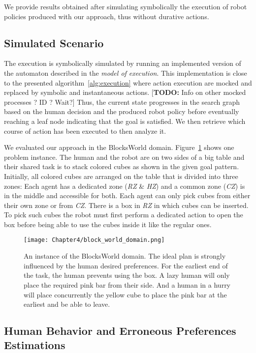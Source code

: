 We provide results obtained after simulating symbolically the execution of robot policies produced with our approach, thus without durative actions. 

    \subsection{Simulated Scenario}

The execution is symbolically simulated by running an implemented version of the automaton described in the \textit{model of execution}. This implementation is close to the presented algorithm~\ref{alg:execution} where action execution are mocked and replaced by symbolic and instantaneous actions. [\textbf{TODO: }Info on other mocked processes ? ID ? Wait?]
Thus, the current state progresses in the search graph based on the human decision and the produced robot policy before eventually reaching a leaf node indicating that the goal is satisfied. 
We then retrieve which course of action has been executed to then analyze it.

We evaluated our approach in the BlocksWorld domain. Figure~\ref{fig:block_world_domain} shows one problem instance. 
The human and the robot are on two sides of a big table and their shared task is to stack colored cubes as shown in the given goal pattern. 
Initially, all colored cubes are arranged on the table that is divided into three zones: Each agent has a dedicated zone (\textit{RZ} \& \textit{HZ}) and a common zone (\textit{CZ}) is in the middle and accessible for both. 
Each agent can only pick cubes from either their own zone or from \textit{CZ}. 
There is a box in \textit{RZ} in which cubes can be inserted. To pick such cubes the robot must first perform a dedicated action to open the box before being able to use the cubes inside it like the regular ones.


\begin{figure}
    \centering
    \texttt{[image: Chapter4/block\_world\_domain.png]}
    \caption{An instance of the BlocksWorld domain. The ideal plan is strongly influenced by the human desired preferences. For the earliest end of the task, the human prevents using the box. A lazy human will only place the required pink bar from their side. And a human in a hurry will place concurrently the yellow cube to place the pink bar at the earliest and be able to leave.}
    \label{fig:block_world_domain}
\end{figure}


    \subsection{Human Behavior and Erroneous Preferences Estimations}

